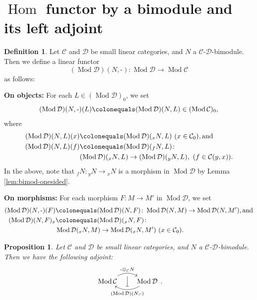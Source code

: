\documentclass{surv-l}
\numberwithin{equation}{chapter}
\numberwithin{figure}{chapter}
\theoremstyle{plain}
\newtheorem{prp}[thm]{Proposition}
\theoremstyle{definition}
\newtheorem{dfn}[thm]{Definition}
\theoremstyle{remark}
\newcommand{\Ar}[3]{\ar[from={#1}, to={#2}, #3]}
\DeclareMathOperator{\Hom}{Hom}
\DeclareMathOperator{\Mod}{Mod}
\begin{document}
\section{$\Hom$ functor by a bimodule and its left adjoint}\label{sec:7.3}
\begin{dfn}
Let ${\mathcal{C}}$ and ${\mathcal{D}}$ be small linear categories, and $N$ a ${\mathcal{C}}$-${\mathcal{D}}$-bimodule.
Then we define a linear functor
\[
(\Mod{\mathcal{D}})(N, \text{-}) \colon \Mod{\mathcal{D}} \to \Mod{\mathcal{C}}
\]
as follows:

{\bf On objects:}
For each $L \in (\Mod{\mathcal{D}})_0$, we set
\[
(\Mod{\mathcal{D}})(N, \text{-})(L) \colonequals  (\Mod{\mathcal{D}})(N, L) \in (\Mod{\mathcal{C}})_0,
\]
where
\[
\begin{aligned}
(\Mod{\mathcal{D}})(N, L)(x)&\colonequals  (\Mod{\mathcal{D}})({}_xN, L)\ (x \in {\mathcal{C}}_0), \text{and}\\
(\Mod{\mathcal{D}})(N, L)(f)&\colonequals  (\Mod{\mathcal{D}})({}_fN, L) \colon \\
&(\Mod{\mathcal{D}})({}_xN, L)  \to (\Mod{\mathcal{D}})({}_yN, L),\ (f \in {\mathcal{C}}(y, x)).
\end{aligned}
\]
In the above, note that ${}_fN \colon {}_yN  \to {}_xN$ is a morphism in $\Mod{\mathcal{D}}$
by Lemma \ref{lem:bimod-onesided}.

{\bf On morphisms:}
For each morphism $F \colon M \to M'$ in $\Mod{\mathcal{D}}$, we set
\[
\begin{aligned}
(\Mod{\mathcal{D}})(N, \text{-})(F) &\colonequals  (\Mod{\mathcal{D}})(N, F) \colon \Mod{\mathcal{D}}(N, M) \to \Mod{\mathcal{D}}(N, M'), \text{and}\\
(\Mod{\mathcal{D}})(N, F)_x&\colonequals  (\Mod{\mathcal{D}})({}_xN, F) \colon \\
&\Mod{\mathcal{D}}({}_xN, M) \to \Mod{\mathcal{D}}({}_xN, M') \ (x \in {\mathcal{C}}_0).
\end{aligned}
\]
\end{dfn}

\begin{prp}\label{prp:Hom-tensor-adj}
Let ${\mathcal{C}}$ and ${\mathcal{D}}$ be small linear categories, and $N$ a ${\mathcal{C}}$-${\mathcal{D}}$-bimodule.
Then we have the following adjoint:
\[
\begin{tikzcd}[row sep=4em, column sep=2em]
\Mod{\mathcal{C}} \ar[r, bend left, "\text{-}\otimes_{\mathcal{C}} N", "" '{name=D-L}]
& \Mod{\mathcal{D}} \ar[l, bend left, "{(\Mod{\mathcal{D}})(N, \text{-})}", "" '{name=U-R}]
\Ar{D-L}{U-R}{-|}
\end{tikzcd}.
\]
\end{prp}
\end{document}
